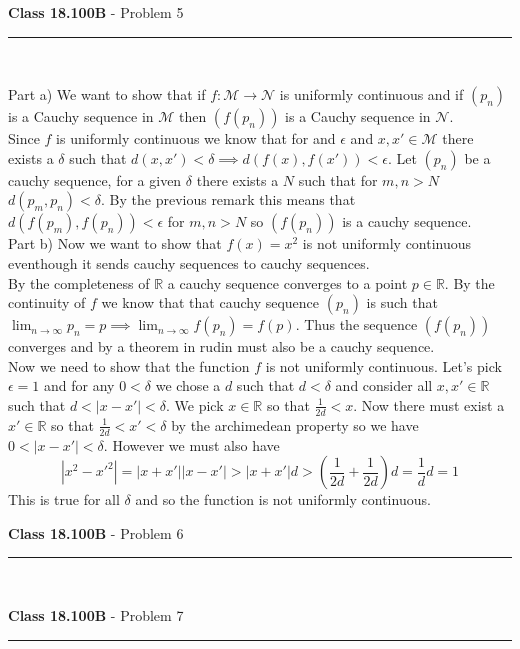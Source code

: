 \documentclass[11pt,reqno]{article}
\begin{document}
\vspace{15pt}
\begin{flushleft} 
\textbf{Class 18.100B} - Problem 5\\
\rule{500pt}{1pt}\\
\end{flushleft} 

\noindent Part a) We want to show that if $f: \mathcal{M} \to \mathcal{N}$ is uniformly continuous and if $(p_n)$ is a Cauchy sequence in $\mathcal{M}$ then $(f(p_n))$ is a Cauchy sequence in $\mathcal{N}$.\\
\indent Since $f$ is uniformly continuous we know that for and $\epsilon$ and $x, x' \in \mathcal{M}$ there exists a $\delta$ such that $d(x,x') < \delta \implies d(f(x),f(x')) < \epsilon$. Let $(p_n)$ be a cauchy sequence, for a given $\delta$ there exists a $N$ such that for $m,n > N$ $d(p_m,p_n) < \delta$. By the previous remark this means that $d(f(p_m),f(p_n)) < \epsilon$ for $m,n > N$ so $(f(p_n))$ is a cauchy sequence. \\

\noindent Part b) Now we want to show that $f(x) = x^2$ is not uniformly continuous eventhough it sends cauchy sequences to cauchy sequences.\\
\indent By the completeness of $\mathbb{R}$ a cauchy sequence converges to a point $p \in \mathbb{R}$. By the continuity of $f$ we know that that cauchy sequence $(p_n)$ is such that $\lim_{n \to \infty} p_n = p \implies \lim_{n \to \infty} f(p_n) = f(p)$. Thus the sequence $(f(p_n))$ converges and by a theorem in rudin must also be a cauchy sequence.\\
\indent Now we need to show that the function $f$ is not uniformly continuous. Let's pick $\epsilon = 1$ and for any $0 < \delta$ we chose a $d$ such that $d < \delta$ and consider all $x,x' \in \mathbb{R}$ such that $d < |x-x'| < \delta$. We pick $x \in \mathbb{R}$ so that $\frac{1}{2d} < x$. Now there must exist a $x' \in \mathbb{R}$ so that $\frac{1}{2d} < x' < \delta$ by the archimedean property so we have $0 < |x - x'| < \delta$. However we must also have \[|x^2 - x'^2| = |x+x'||x-x'| > |x+x'|d > (\frac{1}{2d}+\frac{1}{2d})d = \frac{1}{d}d = 1\]
This is true for all $\delta$ and so the function is not uniformly continuous.

\vspace{15pt}
\begin{flushleft} 
\textbf{Class 18.100B} - Problem 6\\
\rule{500pt}{1pt}\\
\end{flushleft} 


\vspace{15pt}
\begin{flushleft} 
\textbf{Class 18.100B} - Problem 7\\
\rule{500pt}{1pt}\\
\end{flushleft} 




\end{document}
